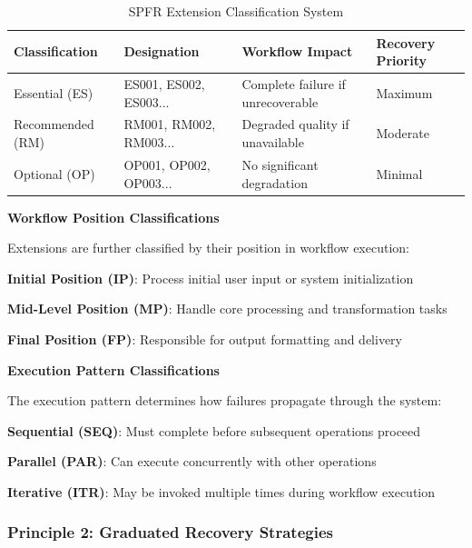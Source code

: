 \begin{table}[h]
\centering
\caption{SPFR Extension Classification System}
\label{tab:spfr-classification}
\begin{tabular}{@{}llll@{}}
\toprule
\textbf{Classification} & \textbf{Designation} & \textbf{Workflow Impact} & \textbf{Recovery Priority} \\
\midrule
Essential (ES) & ES001, ES002, ES003... & Complete failure if unrecoverable & Maximum \\
Recommended (RM) & RM001, RM002, RM003... & Degraded quality if unavailable & Moderate \\
Optional (OP) & OP001, OP002, OP003... & No significant degradation & Minimal \\
\bottomrule
\end{tabular}
\end{table}

\textbf{Workflow Position Classifications}

Extensions are further classified by their position in workflow execution:

\begin{compactlist}
    \item \textbf{Initial Position (IP)}: Process initial user input or system initialization
    \item \textbf{Mid-Level Position (MP)}: Handle core processing and transformation tasks
    \item \textbf{Final Position (FP)}: Responsible for output formatting and delivery
\end{compactlist}

\textbf{Execution Pattern Classifications}

The execution pattern determines how failures propagate through the system:

\begin{compactlist}
    \item \textbf{Sequential (SEQ)}: Must complete before subsequent operations proceed
    \item \textbf{Parallel (PAR)}: Can execute concurrently with other operations
    \item \textbf{Iterative (ITR)}: May be invoked multiple times during workflow execution
\end{compactlist}

\subsubsection{Principle 2: Graduated Recovery Strategies}

